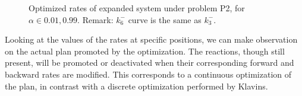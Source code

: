 		\begin{figure}[h!]
			\centering
				\caption{Optimized rates of expanded system under problem P2, for $\alpha \in {0.01, 0.99}$. Remark: $k_6^-$ curve is the same as $k_3^-$.}
		\label{fig:exp_optim_varying_rates} %
		\end{figure}
		
		Looking at the values of the rates at specific positions, we can make observation on the actual plan promoted by the optimization. The reactions, though still present, will be promoted or deactivated when their corresponding forward and backward rates are modified. This corresponds to a continuous optimization of the plan, in contrast with a discrete optimization performed by Klavins\cite{Klavins:2007p2600}.
		
